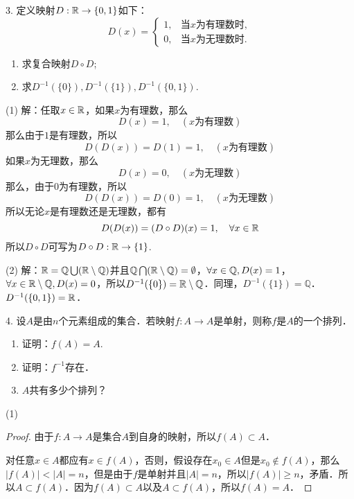 3. 定义映射$D: \mathbb{R} \to \{ 0, 1 \}$如下：
\begin{equation}
    D(x) = \begin{cases}
        1, & \text{当}x\text{为有理数时}, \\
        0, & \text{当}x\text{为无理数时}.
    \end{cases}
\end{equation}
\begin{enumerate}
    \item 求复合映射$D \circ D$;
    \item 求$D^{-1}(\{0\}), D^{-1}(\{1\}), D^{-1}(\{0,1\})$.
\end{enumerate}

(1) 解：任取$x \in \mathbb{R}$，如果$x$为有理数，那么
\begin{equation}
    D(x) = 1, \quad (x\text{为有理数})
\end{equation}
那么由于$1$是有理数，所以
\begin{equation}
    D(D(x)) = D(1) = 1, \quad (x\text{为有理数})
\end{equation}
如果$x$为无理数，那么
\begin{equation}
    D(x) = 0, \quad (x\text{为无理数})
\end{equation}
那么，由于$0$为有理数，所以
\begin{equation}
    D(D(x)) = D(0) = 1, \quad (x\text{为无理数})
\end{equation}
所以无论$x$是有理数还是无理数，都有
\begin{equation}
    D(D(x)) = (D \circ D)(x) = 1, \quad \forall x \in \mathbb{R}
\end{equation}
所以$D \circ D$可写为$D \circ D: \mathbb{R} \to \{ 1 \}$.

(2) 解：$\mathbb{R} = \mathbb{Q} \bigcup (\mathbb{R} \setminus \mathbb{Q})$并且$\mathbb{Q} \bigcap (\mathbb{R} \setminus \mathbb{Q}) = \emptyset$，$\forall x \in \mathbb{Q}, D(x) = 1$，$\forall x \in \mathbb{R} \setminus \mathbb{Q}, D(x) = 0$，所以$D^{-1}(\{0\}) = \mathbb{R\setminus Q}$．同理，$D^{-1}(\{1\}) = \mathbb{Q}$．$D^{-1}(\{0, 1\}) = \mathbb{R}$．

4. 设$A$是由$n$个元素组成的集合．若映射$f: A \to A$是单射，则称$f$是$A$的一个排列．
\begin{enumerate}
    \item 证明：$f(A) = A$. 
    \item 证明：$f^{-1}$存在．
    \item $A$共有多少个排列？
\end{enumerate}

(1)
\begin{proof}
由于$f: A \to A$是集合$A$到自身的映射，所以$f(A) \subset A$．

对任意$x \in A$都应有$x \in f(A)$，否则，假设存在$x_0 \in A$但是$x_0 \not\in f(A)$，那么$| f(A) | < |A| = n$，但是由于$f$是单射并且$|A| = n$，所以$|f(A)| \geq n$，矛盾．所以$A \subset f(A)$．因为$f(A) \subset A$以及$A \subset f(A)$，所以$f(A) = A$．
\end{proof}

